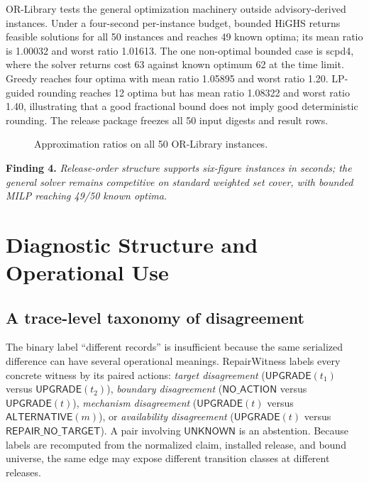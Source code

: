 \documentclass[10pt,conference]{IEEEtran}
\newcommand{\unknown}{\ensuremath{\mathsf{UNKNOWN}}}
\newcommand{\noaction}{\ensuremath{\mathsf{NO\_ACTION}}}
\newcommand{\upgrade}{\ensuremath{\mathsf{UPGRADE}}}
\newcommand{\alternative}{\ensuremath{\mathsf{ALTERNATIVE}}}
\newcommand{\notarget}{\ensuremath{\mathsf{REPAIR\_NO\_TARGET}}}
\newcommand{\figsmall}{\rmfamily\footnotesize}
\begin{document}
OR-Library tests the general optimization machinery outside advisory-derived instances. Under a four-second per-instance budget, bounded HiGHS returns feasible solutions for all 50 instances and reaches 49 known optima; its mean ratio is 1.00032 and worst ratio 1.01613. The one non-optimal bounded case is scpd4, where the solver returns cost 63 against known optimum 62 at the time limit. Greedy reaches four optima with mean ratio 1.05895 and worst ratio 1.20. LP-guided rounding reaches 12 optima but has mean ratio 1.08322 and worst ratio 1.40, illustrating that a good fractional bound does not imply good deterministic rounding. The release package freezes all 50 input digests and result rows.

\begin{figure}[t]
\centering
{}
\caption{Approximation ratios on all 50 OR-Library instances.}
\label{fig:orlib}
\end{figure}

\textbf{Finding 4.} \emph{Release-order structure supports six-figure instances in seconds; the general solver remains competitive on standard weighted set cover, with bounded MILP reaching 49/50 known optima.}


\section{Diagnostic Structure and Operational Use}
\subsection{A trace-level taxonomy of disagreement}
The binary label ``different records'' is insufficient because the same serialized difference can have several operational meanings. RepairWitness labels every concrete witness by its paired actions: \emph{target disagreement} ($\upgrade(t_1)$ versus $\upgrade(t_2)$), \emph{boundary disagreement} ($\noaction$ versus $\upgrade(t)$), \emph{mechanism disagreement} ($\upgrade(t)$ versus $\alternative(m)$), or \emph{availability disagreement} ($\upgrade(t)$ versus $\notarget$). A pair involving \unknown{} is an abstention. Because labels are recomputed from the normalized claim, installed release, and bound universe, the same edge may expose different transition classes at different releases.
\end{document}
